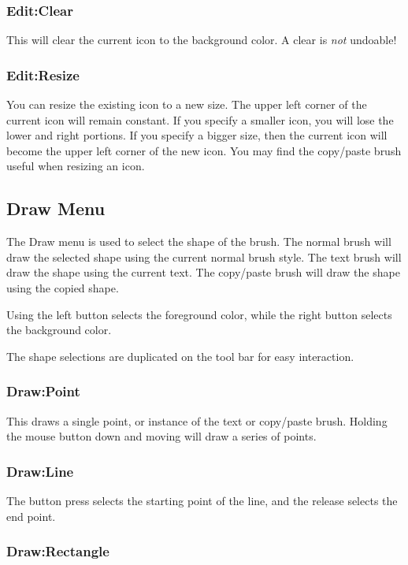 \subsubsection* {Edit:Clear}

This will clear the current icon to the background color.
A clear is \emph{not} undoable!

\subsubsection* {Edit:Resize}

You can resize the existing icon to a new size. The upper
left corner of the current icon will remain constant.
If you specify a smaller icon, you will lose the
lower and right portions. If you specify a bigger size,
then the current icon will become the upper left corner
of the new icon.  You may find the copy/paste brush
useful when resizing an icon.

\subsection {Draw Menu}

The Draw menu is used to select the shape of the brush.
The normal brush will draw the selected shape using
the current normal brush style. The text brush will
draw the shape using the current text. The copy/paste
brush will draw the shape using the copied shape.

Using the left button selects the foreground color,
while the right button selects the background color.

The shape selections are duplicated on the tool bar
for easy interaction.

\subsubsection* {Draw:Point}

This draws a single point, or instance of the text
or copy/paste brush. Holding the mouse button down and
moving will draw a series of points.

\subsubsection* {Draw:Line}

The button press selects the starting point of the
line, and the release selects the end point.

\subsubsection* {Draw:Rectangle}


